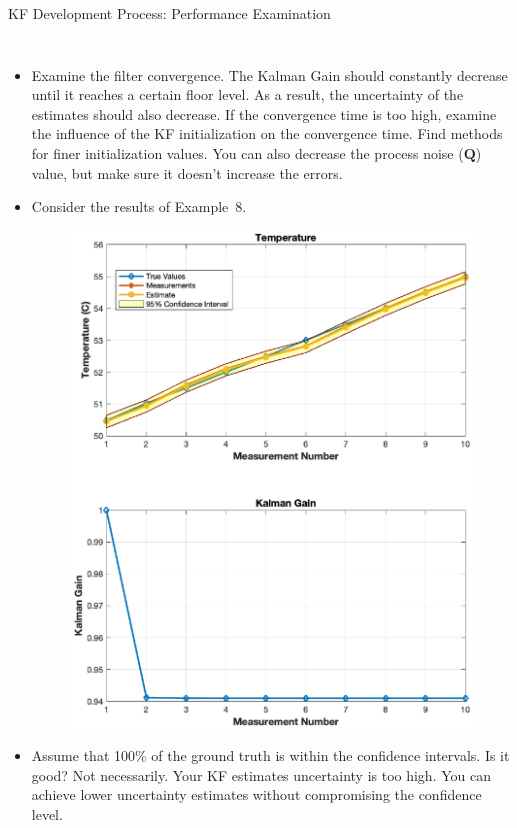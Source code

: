 \begin{frame}{KF Development Process: Performance Examination}
\begin{columns}
\begin{itemize}
    \item Examine the filter convergence. The Kalman Gain should constantly decrease until it reaches a certain floor level. As a result, the uncertainty of the estimates should
also decrease. If the convergence time is too high, examine the influence of the KF initialization on the convergence time. Find methods for finer initialization values. You can also decrease the process noise ($\bm{Q}$) value, but make sure it doesn’t increase the errors.
\item Consider the results of Example~8.
\vspace{-5pt}
\begin{figure}
    \centering
    \includegraphics[trim={0 13cm 0 0},clip, width=0.5\linewidth]{Figures/Chapter1/ex8_KalmanFilter_ProcessNoise_II.eps}
\end{figure}

\item Assume that 100\% of the ground truth is within the confidence intervals. Is it good?
Not necessarily. Your KF estimates uncertainty is too high. You can achieve lower uncertainty estimates without compromising the confidence level.
\end{itemize}
    
\end{columns}
\end{frame}